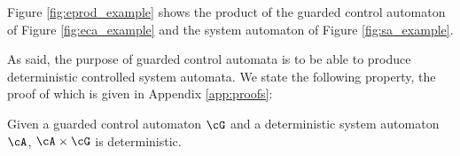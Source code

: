 \begin{example}
Figure \ref{fig:eprod_example} shows the product of the guarded control automaton of Figure \ref{fig:eca_example} and the system automaton of Figure \ref{fig:sa_example}.
\end{example}


As said, the purpose of guarded control automata is to be able to produce deterministic controlled system automata. We state the following property, the proof of which is given in Appendix \ref{app:proofs}:

\begin{proposition}\label{prop:detprod}
Given a guarded control automaton $\cG$ and a deterministic system automaton $\cA$, $\cA \times \cG$ is deterministic. 
\end{proposition}
